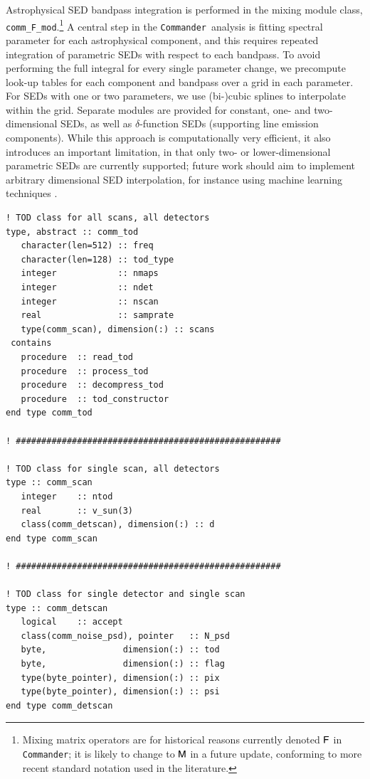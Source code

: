 \documentclass[twocolumn]{aa}
\def\commander{\texttt{Commander}}
\newcommand{\F}[0]{\tens{F}}
\newcommand{\M}[0]{\tens{M}}
\begin{document}
Astrophysical SED bandpass integration is performed in the mixing
module class, \texttt{comm\_F\_mod}.\footnote{Mixing matrix operators
  are for historical reasons currently denoted $\F$ in \commander; it
  is likely to change to $\M$ in a future update, conforming to more
  recent standard notation used in the literature.} A central step in
the \commander\ analysis is fitting spectral parameter for each
astrophysical component, and this requires repeated integration of
parametric SEDs with respect to each bandpass. To avoid performing the
full integral for every single parameter change, we precompute look-up
tables for each component and bandpass over a grid in each
parameter. For SEDs with one or two parameters, we use (bi-)cubic
splines to interpolate within the grid. Separate modules are provided
for constant, one- and two-dimensional SEDs, as well as
$\delta$-function SEDs (supporting line emission components). While
this approach is computationally very efficient, it also introduces an
important limitation, in that only two- or lower-dimensional
parametric SEDs are currently supported; future work should aim to
implement arbitrary dimensional SED interpolation, for instance using
machine learning techniques \citep[e.g.,][]{fendt:2007}.

\begin{lstfloat}[t]
  {\scriptsize
    \begin{tcolorbox}
\begin{lstlisting}
! TOD class for all scans, all detectors
type, abstract :: comm_tod
   character(len=512) :: freq
   character(len=128) :: tod_type
   integer            :: nmaps  
   integer            :: ndet   
   integer            :: nscan  
   real               :: samprate
   type(comm_scan), dimension(:) :: scans
 contains
   procedure  :: read_tod
   procedure  :: process_tod
   procedure  :: decompress_tod
   procedure  :: tod_constructor
end type comm_tod
   
! ####################################################

! TOD class for single scan, all detectors
type :: comm_scan
   integer    :: ntod
   real       :: v_sun(3)
   class(comm_detscan), dimension(:) :: d
end type comm_scan

! ####################################################

! TOD class for single detector and single scan
type :: comm_detscan
   logical    :: accept
   class(comm_noise_psd), pointer   :: N_psd
   byte,               dimension(:) :: tod
   byte,               dimension(:) :: flag
   type(byte_pointer), dimension(:) :: pix
   type(byte_pointer), dimension(:) :: psi
end type comm_detscan
\end{lstlisting}
    \end{tcolorbox}
}
\caption{TOD object structure used in \commander. Note that these
  module descriptions are incomplete, and only intended to illustrate
  the structure, not the full contents. }\label{listing:tod}
\end{lstfloat}
\end{document}
